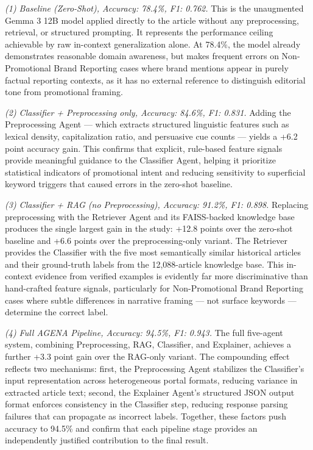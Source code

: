 \documentclass{ieeeaccess}
\begin{document}
\textit{(1) Baseline (Zero-Shot), Accuracy: 78.4\%, F1: 0.762.} This is the unaugmented Gemma 3 12B model applied directly to the article without any preprocessing, retrieval, or structured prompting. It represents the performance ceiling achievable by raw in-context generalization alone. At 78.4\%, the model already demonstrates reasonable domain awareness, but makes frequent errors on Non-Promotional Brand Reporting cases where brand mentions appear in purely factual reporting contexts, as it has no external reference to distinguish editorial tone from promotional framing.

\textit{(2) Classifier + Preprocessing only, Accuracy: 84.6\%, F1: 0.831.} Adding the Preprocessing Agent --- which extracts structured linguistic features such as lexical density, capitalization ratio, and persuasive cue counts --- yields a +6.2 point accuracy gain. This confirms that explicit, rule-based feature signals provide meaningful guidance to the Classifier Agent, helping it prioritize statistical indicators of promotional intent and reducing sensitivity to superficial keyword triggers that caused errors in the zero-shot baseline.

\textit{(3) Classifier + RAG (no Preprocessing), Accuracy: 91.2\%, F1: 0.898.} Replacing preprocessing with the Retriever Agent and its FAISS-backed knowledge base produces the single largest gain in the study: +12.8 points over the zero-shot baseline and +6.6 points over the preprocessing-only variant. The Retriever provides the Classifier with the five most semantically similar historical articles and their ground-truth labels from the 12,088-article knowledge base. This in-context evidence from verified examples is evidently far more discriminative than hand-crafted feature signals, particularly for Non-Promotional Brand Reporting cases where subtle differences in narrative framing --- not surface keywords --- determine the correct label.

\textit{(4) Full AGENA Pipeline, Accuracy: 94.5\%, F1: 0.943.} The full five-agent system, combining Preprocessing, RAG, Classifier, and Explainer, achieves a further +3.3 point gain over the RAG-only variant. The compounding effect reflects two mechanisms: first, the Preprocessing Agent stabilizes the Classifier's input representation across heterogeneous portal formats, reducing variance in extracted article text; second, the Explainer Agent's structured JSON output format enforces consistency in the Classifier step, reducing response parsing failures that can propagate as incorrect labels. Together, these factors push accuracy to 94.5\% and confirm that each pipeline stage provides an independently justified contribution to the final result.
\end{document}
